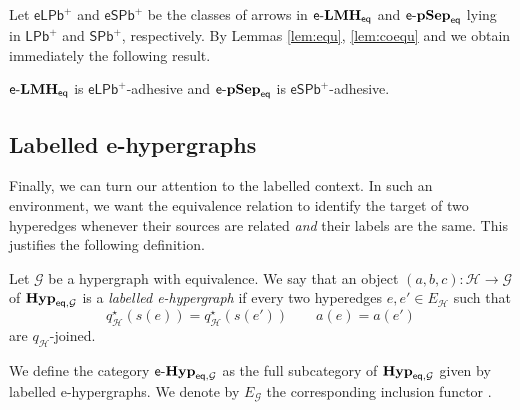 \documentclass[3p]{elsarticle}
\newcommand{\pblp}{\mathsf{LPb}^{+}}
\newcommand{\pbsp}{\mathsf{SPb}^{+}}
\newcommand{\epbl}{\mathsf{eLPb}^{+}}
\newcommand{\epbs}{\mathsf{eSPb}^{+}}
\newcommand{\eq}{\mathsf{eq}}
\newcommand{\catname}[1]{\textbf{\textup{#1}}}
\newcommand{\EqHyps}{\catname{Hyp}_{\mathsf{eq}, \mathcal{G}}}
\newcommand{\eggl}{\mathsf{e}\text{-}\catname{Hyp}_{\eq, \mathcal{G}}}
\newcommand{\elm}{\mathsf{e}\text{-}\catname{LMH}_\eq}
\newcommand{\eps}{\mathsf{e}\text{-}\catname{pSep}_\eq}
\theoremstyle{remark}
\theoremstyle{definition}
\begin{document}
Let $\epbl$ and $\epbs$ be the classes of arrows in  $\elm$ and $\eps$ lying in $\pblp$ and $\pbsp$, respectively. By Lemmas \ref{lem:equ}, \ref{lem:coequ} and  we obtain immediately the following result.

\begin{cor}
	$\elm$ is $\epbl$-adhesive and $\eps$ is $\epbs$-adhesive.
\end{cor}


\subsection{Labelled e-hypergraphs}\label{sec:sepegg}

Finally, we can turn our attention to the labelled context. In such an environment, we want the equivalence relation to identify the target of two hyperedges whenever their sources are related \emph{and} their labels are the same. This justifies the following definition.

\begin{defi} Let $\mathcal{G}$ be a hypergraph with equivalence. We say that an object $(a,b,c)\colon \mathcal{H}\to \mathcal{G}$ of $\EqHyps$ is a \emph{labelled e-hypergraph} if every two hyperedges $e,e'\in E_{\mathcal{H}}$ such that
	\[q^\star_{\mathcal{H}}(s(e))=q^\star_{\mathcal{H}}(s(e')) \qquad a(e) = a(e')\]
	are $q_\mathcal{H}$-joined.
	
 We define the category $\eggl$ as the full subcategory of $\EqHyps$ given by labelled e-hypergraphs. We denote by $E_\mathcal{G}$ the corresponding inclusion functor .
\end{defi}
\end{document}
